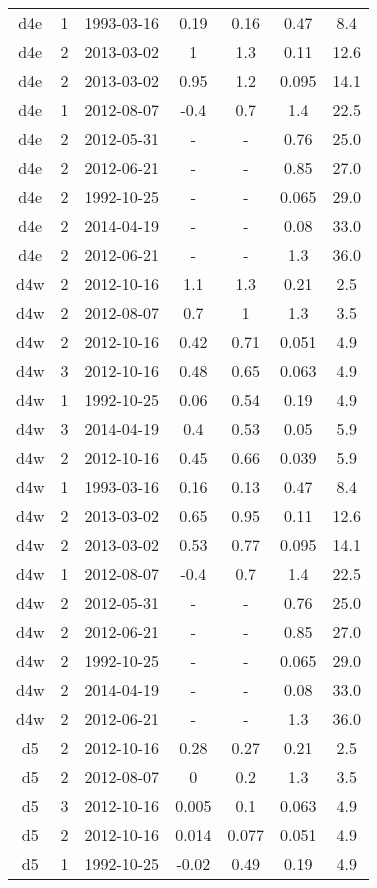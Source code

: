 \begin{table*}[htp]
\begin{tabular}{ccccccc}
d4e & 1 & 1993-03-16 & 0.19 & 0.16 & 0.47 & 8.4 \\
d4e & 2 & 2013-03-02 & 1 & 1.3 & 0.11 & 12.6 \\
d4e & 2 & 2013-03-02 & 0.95 & 1.2 & 0.095 & 14.1 \\
d4e & 1 & 2012-08-07 & -0.4 & 0.7 & 1.4 & 22.5 \\
d4e & 2 & 2012-05-31 & - & - & 0.76 & 25.0 \\
d4e & 2 & 2012-06-21 & - & - & 0.85 & 27.0 \\
d4e & 2 & 1992-10-25 & - & - & 0.065 & 29.0 \\
d4e & 2 & 2014-04-19 & - & - & 0.08 & 33.0 \\
d4e & 2 & 2012-06-21 & - & - & 1.3 & 36.0 \\
d4w & 2 & 2012-10-16 & 1.1 & 1.3 & 0.21 & 2.5 \\
d4w & 2 & 2012-08-07 & 0.7 & 1 & 1.3 & 3.5 \\
d4w & 2 & 2012-10-16 & 0.42 & 0.71 & 0.051 & 4.9 \\
d4w & 3 & 2012-10-16 & 0.48 & 0.65 & 0.063 & 4.9 \\
d4w & 1 & 1992-10-25 & 0.06 & 0.54 & 0.19 & 4.9 \\
d4w & 3 & 2014-04-19 & 0.4 & 0.53 & 0.05 & 5.9 \\
d4w & 2 & 2012-10-16 & 0.45 & 0.66 & 0.039 & 5.9 \\
d4w & 1 & 1993-03-16 & 0.16 & 0.13 & 0.47 & 8.4 \\
d4w & 2 & 2013-03-02 & 0.65 & 0.95 & 0.11 & 12.6 \\
d4w & 2 & 2013-03-02 & 0.53 & 0.77 & 0.095 & 14.1 \\
d4w & 1 & 2012-08-07 & -0.4 & 0.7 & 1.4 & 22.5 \\
d4w & 2 & 2012-05-31 & - & - & 0.76 & 25.0 \\
d4w & 2 & 2012-06-21 & - & - & 0.85 & 27.0 \\
d4w & 2 & 1992-10-25 & - & - & 0.065 & 29.0 \\
d4w & 2 & 2014-04-19 & - & - & 0.08 & 33.0 \\
d4w & 2 & 2012-06-21 & - & - & 1.3 & 36.0 \\
d5 & 2 & 2012-10-16 & 0.28 & 0.27 & 0.21 & 2.5 \\
d5 & 2 & 2012-08-07 & 0 & 0.2 & 1.3 & 3.5 \\
d5 & 3 & 2012-10-16 & 0.005 & 0.1 & 0.063 & 4.9 \\
d5 & 2 & 2012-10-16 & 0.014 & 0.077 & 0.051 & 4.9 \\
d5 & 1 & 1992-10-25 & -0.02 & 0.49 & 0.19 & 4.9 \\

\end{tabular}
\end{table*}
